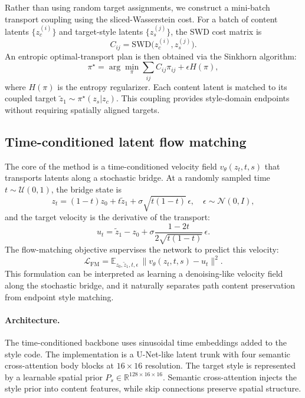 ﻿\documentclass[letterpaper]{article}
\begin{document}
Rather than using random target assignments, we construct a mini-batch transport coupling using the sliced-Wasserstein cost. For a batch of content latents $\{z_c^{(i)}\}$ and target-style latents $\{z_s^{(j)}\}$, the SWD cost matrix is
\begin{equation}
    C_{ij} = \mathrm{SWD}\bigl(z_c^{(i)}, z_s^{(j)}\bigr) .
\end{equation}
An entropic optimal-transport plan is then obtained via the Sinkhorn algorithm:
\begin{equation}
    \pi^\star = \arg\min_\pi \sum_{ij} C_{ij}\pi_{ij} + \epsilon H(\pi),
\end{equation}
where $H(\pi)$ is the entropy regularizer. Each content latent is matched to its coupled target $\tilde{z}_1 \sim \pi^\star(z_s|z_c)$. This coupling provides style-domain endpoints without requiring spatially aligned targets.

\subsection{Time-conditioned latent flow matching}
The core of the method is a time-conditioned velocity field $v_\theta(z_t,t,s)$ that transports latents along a stochastic bridge. At a randomly sampled time $t\sim\mathcal{U}(0,1)$, the bridge state is
\begin{equation}
    z_t = (1-t)z_0 + t\tilde{z}_1 + \sigma\sqrt{t(1-t)}\,\epsilon,
    \quad \epsilon\sim\mathcal{N}(0,I),
\end{equation}
and the target velocity is the derivative of the transport:
\begin{equation}
    u_t = \tilde{z}_1 - z_0 + \sigma\frac{1-2t}{2\sqrt{t(1-t)}}\,\epsilon .
\end{equation}
The flow-matching objective supervises the network to predict this velocity:
\begin{equation}
    \mathcal{L}_{\mathrm{FM}} = \mathbb{E}_{z_0,\tilde{z}_1,t,\epsilon}\,
    \bigl\|v_\theta(z_t,t,s) - u_t\bigr\|^2 .
\end{equation}
This formulation can be interpreted as learning a denoising-like velocity field along the stochastic bridge, and it naturally separates path content preservation from endpoint style matching.

\paragraph{Architecture.}
The time-conditioned backbone uses sinusoidal time embeddings added to the style code. The implementation is a U-Net-like latent trunk with four semantic cross-attention body blocks at $16\times16$ resolution. The target style is represented by a learnable spatial prior $P_s\in\mathbb{R}^{128\times16\times16}$. Semantic cross-attention injects the style prior into content features, while skip connections preserve spatial structure.
\end{document}

